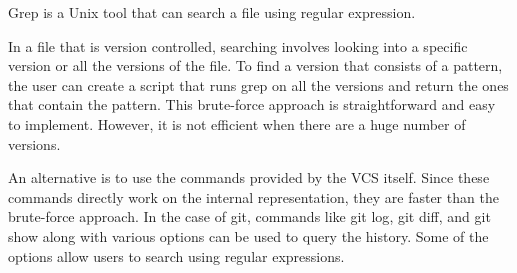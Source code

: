 Grep is a Unix tool that can search a file using regular expression. 


In a file that is version controlled, searching involves looking into a specific version or all the versions of the file. To find a version that consists of a pattern, the user can create a script that runs grep on all the versions and return the ones that contain the pattern. This brute-force approach is straightforward and easy to implement. However, it is not efficient when there are a huge number of versions.

An alternative is to use the commands provided by the VCS itself. Since these commands directly work on the internal representation, they are faster than the brute-force approach. In the case of git, commands like {\ttf git log}, {\ttf git diff}, and {\ttf git show} along with various options can be used to query the history. Some of the options allow users to search using regular expressions.

